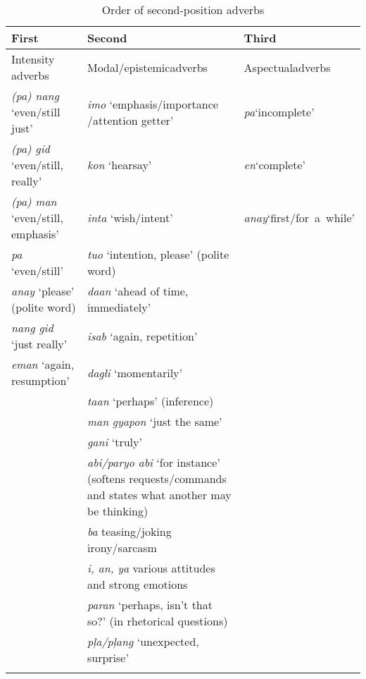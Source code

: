 \begin{table}
\caption{Order of second-position adverbs}
\label{tab:orderofsecondpositionadverbs}
\begin{tabularx}{\textwidth}{lQp{2.3cm}}
\lsptoprule
First & Second & Third \\
\midrule
Intensity adverbs & Modal/epistemic\newline  adverbs & Aspectual\newline adverbs \\
\midrule
\textit{(pa) nang} ‘even/still just’ & \textit{imo} ‘emphasis/importance /attention getter’ & \textit{pa}\newline ‘incomplete’ \\
\tablevspace
\textit{(pa) gid} ‘even/still, really’ & \textit{kon} ‘hearsay’ & \textit{en}\newline ‘complete’ \\
\tablevspace
\textit{(pa) man} ‘even/still, emphasis’ & \textit{inta} ‘wish/intent’\footnotemark{} & \textit{anay}\newline \mbox{‘first{\slash}for a while’} \\
\tablevspace
\textit{pa} ‘even/still’ & \textit{tuo} ‘intention, please’ (polite word) \\
\tablevspace
\textit{anay} ‘please’ (polite word) & \textit{daan} ‘ahead of time, immediately' \\
\tablevspace
\textit{nang gid} ‘just really’ & \textit{isab} ‘again, repetition’ \\
\textit{eman} ‘again, resumption’ & \textit{dagli} ‘momentarily’ \\
& \textit{taan} `perhaps' (inference) & \\
& \textit{man} \textit{gyapon} ‘just the same’ & \\
& \textit{gani} ‘truly’ & \\
& \textit{abi/paryo abi} ‘for instance’ (softens requests{\slash}commands and states what another may be thinking) & \\
& \textit{ba} teasing/joking irony/sarcasm & \\
& \textit{i, an, ya} various attitudes and strong emotions & \\
& \textit{paran} ‘perhaps, isn’t that so?’ (in rhetorical questions) & \\
& \textit{pļa/pļang} ‘unexpected, surprise’ & \\
\lspbottomrule
\end{tabularx}
\end{table}
